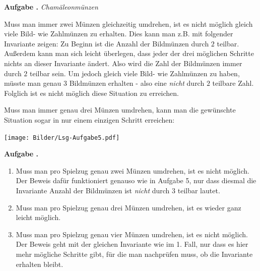 \documentclass[a4paper,ngerman,12pt]{scrartcl}
\theoremstyle{definition}
\theoremstyle{plain}
\theoremstyle{remark}
\newlength{\aufgabenskip}
\newcounter{aufgabennummer}
\newenvironment{aufgabe}[1]{
	\addtocounter{aufgabennummer}{1}
	\textbf{Aufgabe \theaufgabennummer.} \emph{#1} \par
}{\vspace{\aufgabenskip}}
\begin{document}
\newpage
\begin{aufgabe}{Chamäleonmünzen}
	Muss man immer zwei Münzen gleichzeitig umdrehen, ist es nicht möglich gleich viele Bild- wie Zahlmünzen zu erhalten. Dies kann man z.B. mit folgender Invariante zeigen: Zu Beginn ist die Anzahl der Bildmünzen durch $2$ teilbar. Außerdem kann man sich leicht überlegen, dass jeder der drei möglichen Schritte nichts an dieser Invariante ändert. Also wird die Zahl der Bildmünzen immer durch $2$ teilbar sein. Um jedoch gleich viele Bild- wie Zahlmünzen zu haben, müsste man genau $3$ Bildmünzen erhalten - also eine \emph{nicht} durch $2$ teilbare Zahl. Folglich ist es nicht möglich diese Situation zu erreichen.
	
	Muss man immer genau drei Münzen umdrehen, kann man die gewünschte Situation sogar in nur einem einzigen Schritt erreichen:
	\begin{center}
		\texttt{[image: Bilder/Lsg-Aufgabe5.pdf]}
	\end{center}		
\end{aufgabe}

\begin{aufgabe}{}
	\begin{enumerate}
		\item Muss man pro Spielzug genau zwei Münzen umdrehen, ist es nicht möglich. Der Beweis dafür funktioniert genauso wie in Aufgabe 5, nur dass diesmal die Invariante \glqq Anzahl der Bildmünzen ist \emph{nicht} durch $3$ teilbar\grqq{} lautet.
		\item Muss man pro Spielzug genau drei Münzen umdrehen, ist es wieder ganz leicht möglich.
		\item Muss man pro Spielzug genau vier Münzen umdrehen, ist es nicht möglich. Der Beweis geht mit der gleichen Invariante wie im 1. Fall, nur dass es hier mehr mögliche Schritte gibt, für die man nachprüfen muss, ob die Invariante erhalten bleibt.
	\end{enumerate}
\end{aufgabe}
\end{document}
